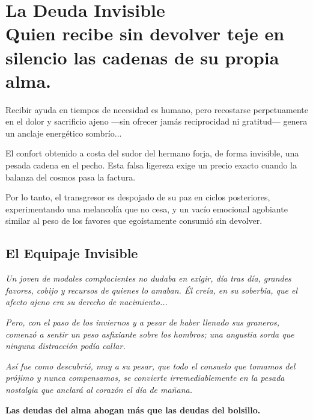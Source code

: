 \chapter[La Deuda Invisible]{La Deuda Invisible\\ \large Quien recibe sin devolver teje en silencio las cadenas de su propia alma.}


\lettrine[lines=3, nindent=0.5em, findent=0.2em]{R}{}ecibir ayuda en tiempos de necesidad es humano, pero recostarse perpetuamente en el dolor y sacrificio ajeno —sin ofrecer jamás reciprocidad ni gratitud— genera un anclaje energético sombrío...

El confort obtenido a costa del sudor del hermano forja, de forma invisible, una pesada cadena en el pecho. Esta falsa ligereza exige un precio exacto cuando la balanza del cosmos pasa la factura.

Por lo tanto, el transgresor es despojado de su paz en ciclos posteriores, experimentando una melancolía que no cesa, y un vacío emocional agobiante similar al peso de los favores que egoístamente consumió sin devolver.

\section{El Equipaje Invisible}
\begin{elegantquote}
\textit{Un joven de modales complacientes no dudaba en exigir, día tras día, grandes favores, cobijo y recursos de quienes lo amaban. Él creía, en su soberbia, que el afecto ajeno era su derecho de nacimiento...}

\textit{Pero, con el paso de los inviernos y a pesar de haber llenado sus graneros, comenzó a sentir un peso asfixiante sobre los hombros; una angustia sorda que ninguna distracción podía callar.}

\textit{Así fue como descubrió, muy a su pesar, que todo el consuelo que tomamos del prójimo y nunca compensamos, se convierte irremediablemente en la pesada nostalgia que anclará al corazón el día de mañana.}

\end{elegantquote}


\vspace{1em}
\begin{center}
    \textbf{\Large Las deudas del alma ahogan más que las deudas del bolsillo.}
\end{center}
\vspace{1em}


